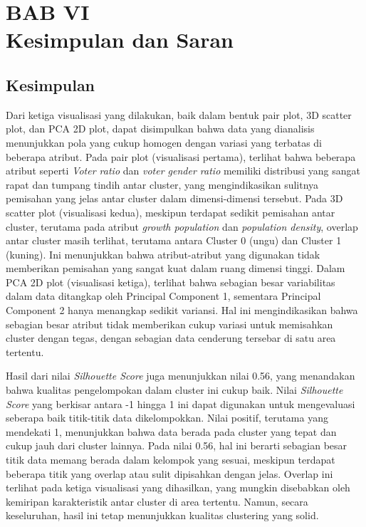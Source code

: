 \newpage
\section*{\centering BAB VI \\ Kesimpulan dan Saran }


\setcounter{section}{6}
\setcounter{subsection}{0}  %
\setcounter{figure}{0}
\setcounter{table}{0}
\setcounter{lstlisting}{0}
\renewcommand{\thetable}{\thesection.\arabic{table}}
\renewcommand{\thefigure}{\thesection.\arabic{figure}}
\renewcommand{\thelstlisting}{\thesection.\arabic{lstlisting}}

\subsection{Kesimpulan}
Dari ketiga visualisasi yang dilakukan, baik dalam bentuk pair plot, 3D scatter plot, dan PCA 2D plot, dapat disimpulkan bahwa data yang dianalisis menunjukkan pola yang cukup homogen dengan variasi yang terbatas di beberapa atribut. Pada pair plot (visualisasi pertama), terlihat bahwa beberapa atribut seperti \textit{Voter ratio} dan \textit{voter gender ratio} memiliki distribusi yang sangat rapat dan tumpang tindih antar cluster, yang mengindikasikan sulitnya pemisahan yang jelas antar cluster dalam dimensi-dimensi tersebut. Pada 3D scatter plot (visualisasi kedua), meskipun terdapat sedikit pemisahan antar cluster, terutama pada atribut \textit{growth population} dan \textit{population density}, overlap antar cluster masih terlihat, terutama antara Cluster 0 (ungu) dan Cluster 1 (kuning). Ini menunjukkan bahwa atribut-atribut yang digunakan tidak memberikan pemisahan yang sangat kuat dalam ruang dimensi tinggi. Dalam PCA 2D plot (visualisasi ketiga), terlihat bahwa sebagian besar variabilitas dalam data ditangkap oleh Principal Component 1, sementara Principal Component 2 hanya menangkap sedikit variansi. Hal ini mengindikasikan bahwa sebagian besar atribut tidak memberikan cukup variasi untuk memisahkan cluster dengan tegas, dengan sebagian data cenderung tersebar di satu area tertentu.

Hasil dari nilai \textit{Silhouette Score} juga menunjukkan nilai 0.56, yang menandakan bahwa kualitas pengelompokan dalam cluster ini cukup baik. Nilai \textit{Silhouette Score} yang berkisar antara -1 hingga 1 ini dapat digunakan untuk mengevaluasi seberapa baik titik-titik data dikelompokkan. Nilai positif, terutama yang mendekati 1, menunjukkan bahwa data berada pada cluster yang tepat dan cukup jauh dari cluster lainnya. Pada nilai 0.56, hal ini berarti sebagian besar titik data memang berada dalam kelompok yang sesuai, meskipun terdapat beberapa titik yang overlap atau sulit dipisahkan dengan jelas. Overlap ini terlihat pada ketiga visualisasi yang dihasilkan, yang mungkin disebabkan oleh kemiripan karakteristik antar cluster di area tertentu. Namun, secara keseluruhan, hasil ini tetap menunjukkan kualitas clustering yang solid.

